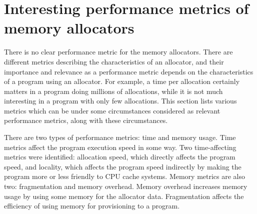 \section{Interesting performance metrics of memory allocators}
\label{metrics}

There is no clear performance metric for the memory allocators. There are different metrics describing the characteristics of an allocator, and their importance and relevance as a performance metric depends on the characteristics of a program using an allocator. For example, a time per allocation certainly matters in a program doing millions of allocations, while it is not much interesting in a program with only few allocations. This section lists various metrics which can be under some circumstances considered as relevant performance metrics, along with these circumstances.

There are two types of performance metrics: time and memory usage. Time metrics affect the program execution speed in some way. Two time-affecting metrics were identified: allocation speed, which directly affects the program speed, and locality, which affects the program speed indirectly by making the program more or less friendly to CPU cache systems. Memory metrics are also two: fragmentation and memory overhead. Memory overhead increases memory usage by using some memory for the allocator data. Fragmentation affects the efficiency of using memory for provisioning to a program.


